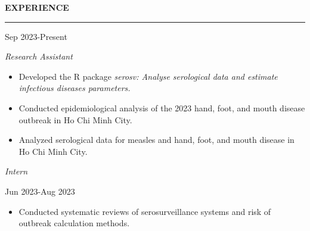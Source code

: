 \documentclass[
  16,
]{article}
\providecommand{\tightlist}{%
  \setlength{\itemsep}{0pt}\setlength{\parskip}{0pt}}\usepackage{longtable,booktabs,array}
\begin{document}
\vspace{3pt}

\begin{large}{\bf EXPERIENCE}
\vspace{3pt}
\hrule
\begin{multicols}{2}
\begin{flushleft}{\bf {}}\end{flushleft}
\begin{flushright}Sep 2023-Present\end{flushright}
\end{multicols}
\vspace{-0.17cm}
\begin{multicols}{2}
\begin{flushleft}\textit{Research Assistant}\end{flushleft}
\end{multicols}
\end{large}

\vspace{-0.16cm}

\begin{itemize}
\tightlist
\item
  Developed the R package \emph{serosv: Analyse serological data and
  estimate infectious diseases parameters.}
\item
  Conducted epidemiological analysis of the 2023 hand, foot, and mouth
  disease outbreak in Ho Chi Minh City.
\item
  Analyzed serological data for measles and hand, foot, and mouth
  disease in Ho Chi Minh City.
\end{itemize}

\vspace{-0.17cm}

\begin{large}
\begin{multicols}{2}
\begin{flushleft}\textit{Intern}\end{flushleft}
\begin{flushright}Jun 2023-Aug 2023\end{flushright}
\end{multicols}
\end{large}

\vspace{-0.16cm}

\begin{itemize}
\tightlist
\item
  Conducted systematic reviews of serosurveillance systems and risk of
  outbreak calculation methods.
\end{itemize}
\end{document}
